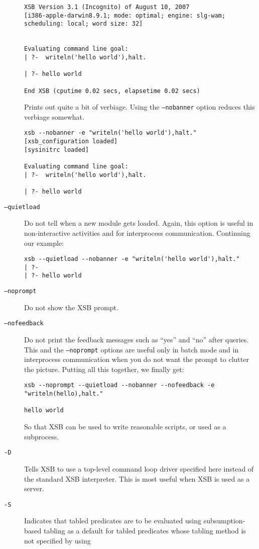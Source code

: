 \begin{description}
\begin{verbatim}
XSB Version 3.1 (Incognito) of August 10, 2007
[i386-apple-darwin8.9.1; mode: optimal; engine: slg-wam; scheduling: local; word size: 32]


Evaluating command line goal:  
| ?-  writeln('hello world'),halt.

| ?- hello world

End XSB (cputime 0.02 secs, elapsetime 0.02 secs)
\end{verbatim}
Prints out quite a bit of verbiage.  Using the {\tt --nobanner} option
reduces this verbiage somewhat.
\begin{verbatim}
xsb --nobanner -e "writeln('hello world'),halt."
[xsb_configuration loaded]
[sysinitrc loaded]

Evaluating command line goal:  
| ?-  writeln('hello world'),halt.

| ?- hello world
\end{verbatim}
%
 \item[{\tt --quietload}] Do not tell when a new module gets
   loaded. Again, this option is useful in non-interactive activities
   and for interprocess communication.  Continuing our example:
\begin{verbatim}
xsb --quietload --nobanner -e "writeln('hello world'),halt."
| ?- 
| ?- hello world
\end{verbatim}
%
  \item[{\tt --noprompt}] Do not show the XSB prompt.
%
\item[{\tt --nofeedback}] Do not print the feedback messages such as
  ``yes'' and ``no'' after queries.
    This and the \texttt{--noprompt} options are useful only in batch
    mode and in interprocess communication when you do not want the prompt
    to clutter the picture.  Putting all this together, we finally get: 
\begin{verbatim}
xsb --noprompt --quietload --nobanner --nofeedback -e "writeln(hello),halt."

hello world
\end{verbatim}
So that XSB can be used to write reasonable scripts, or used as a subprocess.
\item[{\tt -D}] Tells XSB to use a top-level command loop driver specified
  here instead of the standard XSB interpreter. This is most useful when
 XSB is used as a server.
\item[{\tt -S}] Indicates that tabled predicates are to be evaluated
  using subsumption-based tabling as a default for tabled predicates
  whose tabling method is not specified by using


\end{description}
